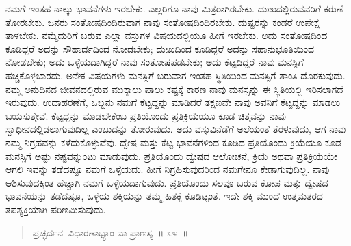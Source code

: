 ನಮಗೆ ಇಂತಹ ನಾಲ್ಕು ಭಾವನೆಗಳು ಇರಬೇಕು. ಎಲ್ಲರಿಗೂ ನಾವು ಮಿತ್ರರಾಗಿರಬೇಕು. ದುಃಖದಲ್ಲಿರುವವರಿಗೆ ಕರುಣೆ ತೋರಬೇಕು. ಜನರು ಸಂತೋಷದಿಂದಿರುವಾಗ ನಾವು ಸಂತೋಷದಿಂದಿರಬೇಕು. ದುಷ್ಟರನ್ನು ಕಂಡರೆ ಉಪೇಕ್ಷೆ ತಾಳಬೇಕು. ನಮ್ಮೆದುರಿಗೆ ಬರುವ ಎಲ್ಲಾ ವಸ್ತುಗಳ ವಿಷಯದಲ್ಲಿಯೂ ಹೀಗೆ ಇರಬೇಕು. ಅದು ಸಂತೋಷದಿಂದ ಕೂಡಿದ್ದರೆ ಅದನ್ನು ಸೌಹಾರ್ದದಿಂದ ನೋಡಬೇಕು; ದುಃಖದಿಂದ ಕೂಡಿದ್ದರೆ ಅದನ್ನು ಸಹಾನುಭೂತಿಯಿಂದ ನೋಡಬೇಕು; ಅದು ಒಳ್ಳೆಯದಾಗಿದ್ದರೆ ನಾವು ಸಂತೋಷಪಡಬೇಕು; ಅದು ಕೆಟ್ಟದಿದ್ದರೆ ನಾವು ಮನಸ್ಸಿಗೆ ಹಚ್ಚಿಕೊಳ್ಳಬಾರದು. ಅನೇಕ ವಿಷಯಗಳು ಮನಸ್ಸಿಗೆ ಬರುವಾಗ ಇಂತಹ ಸ್ಥಿತಿಯಿಂದ ಮನಸ್ಸಿಗೆ ಶಾಂತಿ ದೊರಕುವುದು. ನಮ್ಮ ಅನುದಿನದ ಜೀವನದಲ್ಲಿರುವ ಮುಕ್ಕಾಲು ಪಾಲು ಕಷ್ಟಕ್ಕೆ ಕಾರಣ ನಾವು ಮನಸ್ಸನ್ನು ಈ ಸ್ಥಿತಿಯಲ್ಲಿ ಇರಿಸಲಾಗದೆ ಇರುವುದು. ಉದಾಹರಣೆಗೆ, ಒಬ್ಬನು ನಮಗೆ ಕೆಟ್ಟದ್ದನ್ನು ಮಾಡಿದರೆ ತಕ್ಷಣವೇ ನಾವು ಅವನಿಗೆ ಕೆಟ್ಟದ್ದನ್ನು ಮಾಡಲು ಬಯಸುತ್ತೇವೆ. ಕೆಟ್ಟದ್ದನ್ನು ಮಾಡಬೇಕೆಂಬ ಪ್ರತಿಯೊಂದು ಪ್ರತಿಕ್ರಿಯೆಯೂ ಕೂಡ ಚಿತ್ತವನ್ನು ನಾವು ಸ್ವಾಧೀನದಲ್ಲಿಡಲಾಗುವುದಿಲ್ಲ ಎಂಬುದನ್ನು ತೋರುವುದು. ಅದು ವಸ್ತುವಿನೆಡೆಗೆ ಅಲೆಯಂತೆ ತೆರಳುವುದು, ಆಗ ನಾವು ನಮ್ಮ ನಿಗ್ರಹವನ್ನು ಕಳೆದುಕೊಳ್ಳುವೆವು. ದ್ವೇಷ ಮತ್ತು ಕೆಟ್ಟ ಭಾವನೆಗಳಿಂದ ಕೂಡಿದ ಪ್ರತಿಯೊಂದು ಕ್ರಿಯೆಯೂ ಕೂಡ ಮನಸ್ಸಿಗೆ ಅಷ್ಟು ನಷ್ಟವನ್ನುಂಟು ಮಾಡುವುದು. ಪ್ರತಿಯೊಂದು ದ್ವೇಷದ ಆಲೋಚನೆ, ಕ್ರಿಯೆ ಅಥವಾ ಪ್ರತಿಕ್ರಿಯೆಯೇ ಆಗಲಿ ಇವನ್ನು ತಡೆದಷ್ಟೂ ನಮಗೆ ಒಳ್ಳೆಯದು. ಹೀಗೆ ನಿಗ್ರಹಿಸುವುದರಿಂದ ನಮಗೇನೂ ಕೇಡಾಗುವುದಿಲ್ಲ. ನಾವು ಆಶಿಸುವುದಕ್ಕಿಂತ ಹೆಚ್ಚಾಗಿ ನಮಗೆ ಒಳ್ಳೆಯದಾಗುವುದು. ಪ್ರತಿಯೊಂದು ಸಲವೂ ಬರುವ ಕೋಪ ಮತ್ತು ದ್ವೇಷದ ಭಾವನೆಯನ್ನು ತಡೆದಷ್ಟೂ, ಒಳ್ಳೆಯ ಶಕ್ತಿಯನ್ನು ತಮ್ಮ ಹಿತಕ್ಕೆ ಕೂಡಿಟ್ಟಂತೆ. ಇದೇ ಶಕ್ತಿ ಮುಂದೆ ಉತ್ತಮತರದ ತಪಶ್ಯಕ್ತಿಯಾಗಿ ಪರಿಣಮಿಸುವುದು. 

\newpage

\vspace{-0.3cm}

\begin{verse}
ಪ್ರಚ್ಛರ್ದನ–ವಿಧಾರಣಾಭ್ಯಾಂ ವಾ ಪ್ರಾಣಸ್ಯ~॥ ೩೪~॥
\end{verse}

\vspace{-0.33cm}


\vspace{0.1cm}

